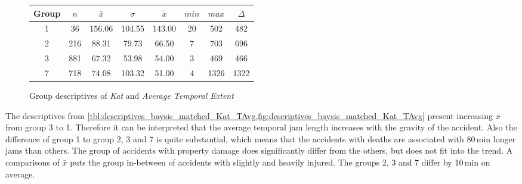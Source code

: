 \begin{figure}[ht!]
	\centering
	\begin{minipage}{0.5\textwidth}
		\tiny
		\setlength{\tabcolsep}{4pt}
		\centering
		\begin{tabular}{c|c|c|c|c|c|c|c}
			\toprule
			Group & $n$ & $\bar{x}$ & $\sigma$ & $\tilde{x}$ & $min$ & $max$ & $\Delta$ \\
			\midrule
			1 & 36  & 156.06 & 104.55 & 143.00 & 20 & 502  & 482  \\ 
			2 & 216 & 88.31  & 79.73  & 66.50  & 7  & 703  & 696  \\ 
			3 & 881 & 67.32  & 53.98  & 54.00  & 3  & 469  & 466  \\ 
			7 & 718 & 74.08  & 103.32 & 51.00  & 4  & 1326 & 1322 \\ 
			\bottomrule
		\end{tabular}
		\label{tbl:descriptives_baysis_matched_Kat_TAvg}
	\end{minipage}%
	\begin{minipage}{0.55\textwidth}
		\data 
        \pgfplotstablesort[sort key=mean, sort cmp=float >]{\datasorted}{\data}
        \tiny
        \centering
		\label{fig:descriptives_baysis_matched_Kat_TAvg}
	\end{minipage}%
	\caption{Group descriptives of  \textit{Kat} and \textit{Average Temporal Extent}}
\end{figure}
The descriptives from \cref{tbl:descriptives_baysis_matched_Kat_TAvg,fig:descriptives_baysis_matched_Kat_TAvg} present increasing $\bar{x}$ from group 3 to 1. Therefore it can be interpreted that the average temporal jam length increases with the gravity of the accident. Also the difference of group 1 to group 2, 3 and 7 is quite substantial, which means that the accidents with deaths are associated with 80\,min longer jams than others. The group of accidents with property damage does significantly differ from the others, but does not fit into the trend. A comparisons of $\bar{x}$ puts the group in-between of accidents with slightly and heavily injured. The groups 2, 3 and 7 differ by 10\,min on average. 
